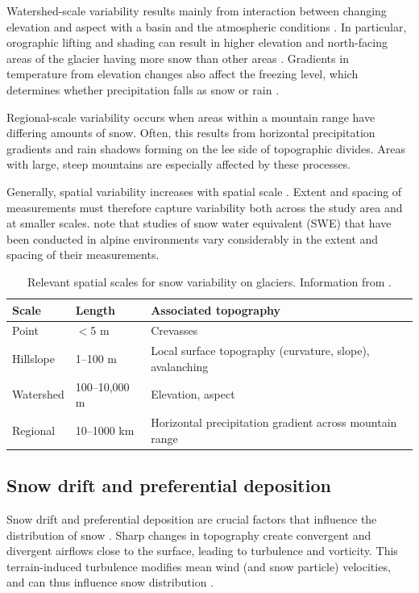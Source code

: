 \documentclass{sfuthesis}
\begin{document}
Watershed-scale variability results mainly from interaction between changing elevation and aspect with a basin and the atmospheric conditions \citep{Clark2011}. In particular, orographic lifting and shading can result in higher elevation and north-facing areas of the glacier having more snow than other areas \citep{Mott2008, Sold2013}. Gradients in temperature from elevation changes also affect the freezing level, which determines whether precipitation falls as snow or rain \citep{Bloschl1991}. 

Regional-scale variability occurs when areas within a mountain range have differing amounts of snow. Often, this results from horizontal precipitation gradients and rain shadows forming on the lee side of topographic divides. Areas with large, steep mountains are especially affected by these processes.

Generally, spatial variability increases with spatial scale \citep{Clark2011}. Extent and spacing of measurements must therefore capture variability both across the study area and at smaller scales. \cite{Clark2011} note that studies of snow water equivalent (SWE) that have been conducted in alpine environments vary considerably in the extent and spacing of their measurements. 

\begin{table}[]
\centering
\caption{Relevant spatial scales for snow variability on glaciers. Information from \cite{Clark2011}.}
\label{scale}
\begin{tabular}{lll}
\textbf{Scale} & \textbf{Length} & \textbf{Associated topography}                     \\ \hline
Point          & $<$5 m         & Crevasses                                               \\
Hillslope      & 1--100 m        & Local surface topography (curvature, slope), avalanching        \\
Watershed      & 100--10,000 m   & Elevation, aspect                                       \\
Regional       & 10--1000 km     & Horizontal precipitation gradient across mountain range
\end{tabular}
\end{table}

\subsection{Snow drift and preferential deposition}
Snow drift and preferential deposition are crucial factors that influence the distribution of snow \citep{Lehning2008, Winstral2002, Clark2011}. Sharp changes in topography create convergent and divergent airflows close to the surface, leading to turbulence and vorticity. This terrain-induced turbulence modifies mean wind (and snow particle) velocities, and can thus influence snow distribution \citep{Mott2008, Lehning2008, Dadic2010}.
\end{document}
